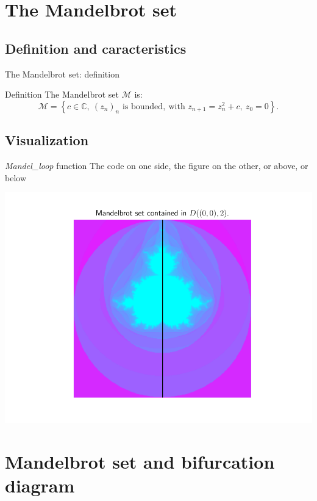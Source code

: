 \documentclass[11pt, compress]{beamer}
\theoremstyle{definition}
\begin{document}
\section[Mandelbrot]{The Mandelbrot set}
\subsection{Definition and caracteristics}
\begin{frame}{The Mandelbrot set: definition}

\begin{block}{Definition}
The Mandelbrot set $\mathcal{M}$ is:
$$\mathcal{M}=\left\{ c\in\mathbb{C},\ (z_n)_n \text{ is bounded},\ \text{with } z_{n+1}=z_n^2+c,\ z_0=0\right\}.$$
\end{block}

\end{frame}

\subsection{Visualization}
\begin{frame}{\emph{Mandel\_loop } function}
The code on one side, the figure on the other, or above, or below


\begin{center}
    \includegraphics[scale=0.55]{mandelbrot.pdf}
\end{center}
\end{frame}




\section[Link]{Mandelbrot set and bifurcation diagram}
\end{document}
